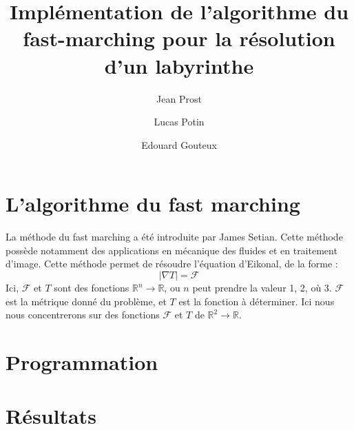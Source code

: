 \documentclass{article}
\title{Implémentation de l'algorithme du fast-marching pour la résolution d'un labyrinthe}
\author{Jean Prost \and Lucas Potin \and Edouard Gouteux}
\begin{document}
	
\section{L'algorithme du fast marching}

La méthode du fast marching a été introduite par James Setian. Cette méthode possède notamment des applications en mécanique des fluides et en traitement d'image. Cette méthode permet de résoudre l'équation d'Eikonal, de la forme :
\begin{equation}
|\nabla T|=\mathcal{F}
\end{equation}
Ici, $ \mathcal{F}$ et $T$ sont des fonctions $\mathbb{R}^n \to \mathbb{R}$, ou $n$ peut prendre la valeur 1, 2, où 3. $\mathcal{F}$ est la métrique donné du problème, et $T$ est la fonction à déterminer. Ici nous nous concentrerons sur des fonctions $ \mathcal{F}$ et $T$ de $\mathbb{R}^2 \to \mathbb{R}$. 
\section{Programmation}

\section{Résultats}
\end{document}
